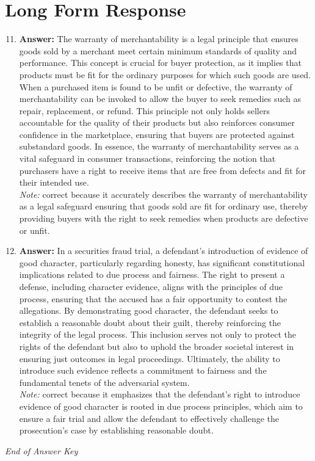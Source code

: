 \documentclass[12pt]{article}
\begin{document}
\section*{Long Form Response}
\begin{enumerate}[label=\arabic*.]
\setcounter{enumi}{10}
\item \textbf{Answer:} The warranty of merchantability is a legal principle that ensures goods sold by a merchant meet certain minimum standards of quality and performance. This concept is crucial for buyer protection, as it implies that products must be fit for the ordinary purposes for which such goods are used. When a purchased item is found to be unfit or defective, the warranty of merchantability can be invoked to allow the buyer to seek remedies such as repair, replacement, or refund. This principle not only holds sellers accountable for the quality of their products but also reinforces consumer confidence in the marketplace, ensuring that buyers are protected against substandard goods. In essence, the warranty of merchantability serves as a vital safeguard in consumer transactions, reinforcing the notion that purchasers have a right to receive items that are free from defects and fit for their intended use.
\\ \textit{Note:} correct because it accurately describes the warranty of merchantability as a legal safeguard ensuring that goods sold are fit for ordinary use, thereby providing buyers with the right to seek remedies when products are defective or unfit.
\item \textbf{Answer:} In a securities fraud trial, a defendant's introduction of evidence of good character, particularly regarding honesty, has significant constitutional implications related to due process and fairness. The right to present a defense, including character evidence, aligns with the principles of due process, ensuring that the accused has a fair opportunity to contest the allegations. By demonstrating good character, the defendant seeks to establish a reasonable doubt about their guilt, thereby reinforcing the integrity of the legal process. This inclusion serves not only to protect the rights of the defendant but also to uphold the broader societal interest in ensuring just outcomes in legal proceedings. Ultimately, the ability to introduce such evidence reflects a commitment to fairness and the fundamental tenets of the adversarial system.
\\ \textit{Note:} correct because it emphasizes that the defendant's right to introduce evidence of good character is rooted in due process principles, which aim to ensure a fair trial and allow the defendant to effectively challenge the prosecution's case by establishing reasonable doubt.
\end{enumerate}

\vfill
\noindent\textit{End of Answer Key}
\end{document}
